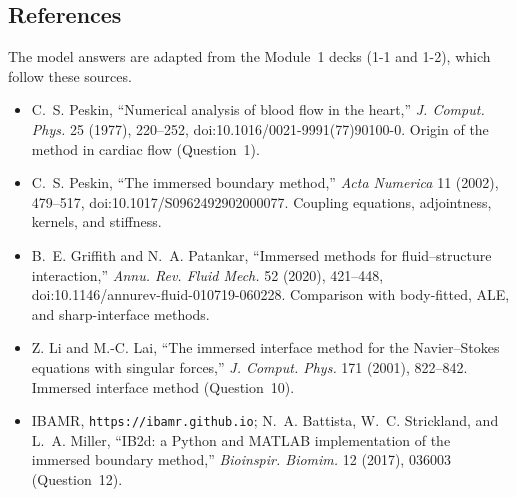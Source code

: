 \documentclass[12pt]{article}
\begin{document}
\subsection*{References}

The model answers are adapted from the Module~1 decks (1-1 and 1-2), which
follow these sources.
\begin{itemize}
\item C.~S. Peskin, ``Numerical analysis of blood flow in the heart,''
  \emph{J. Comput. Phys.} 25 (1977), 220--252,
  doi:10.1016/0021-9991(77)90100-0. Origin of the method in cardiac flow
  (Question~1).
\item C.~S. Peskin, ``The immersed boundary method,'' \emph{Acta Numerica} 11
  (2002), 479--517, doi:10.1017/S0962492902000077. Coupling equations,
  adjointness, kernels, and stiffness.
\item B.~E. Griffith and N.~A. Patankar, ``Immersed methods for
  fluid--structure interaction,'' \emph{Annu. Rev. Fluid Mech.} 52 (2020),
  421--448, doi:10.1146/annurev-fluid-010719-060228. Comparison with
  body-fitted, ALE, and sharp-interface methods.
\item Z. Li and M.-C. Lai, ``The immersed interface method for the
  Navier--Stokes equations with singular forces,'' \emph{J. Comput. Phys.} 171
  (2001), 822--842. Immersed interface method (Question~10).
\item IBAMR, \texttt{https://ibamr.github.io}; N.~A. Battista, W.~C. Strickland,
  and L.~A. Miller, ``IB2d: a Python and MATLAB implementation of the immersed
  boundary method,'' \emph{Bioinspir. Biomim.} 12 (2017), 036003
  (Question~12).
\end{itemize}
\end{document}
